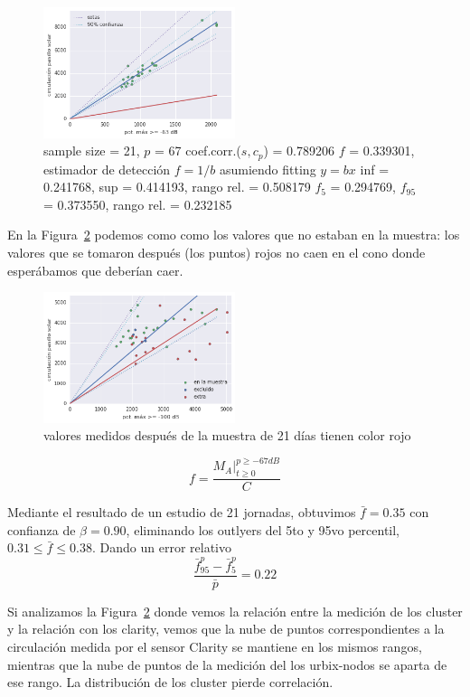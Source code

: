\begin{figure}[H] 
  \centering
  \includegraphics[width=0.5\textwidth]{Fig_fit_circulacion_por_jornada.png}
  \caption{
  sample size = 21, $p$ = 67
coef.corr.($s, c_p$) = 0.789206
$f$ = 0.339301, estimador de detección $f = 1/b$ asumiendo fitting $y = b x$
inf = 0.241768, sup = 0.414193, rango rel. = 0.508179
$f_5$ = 0.294769, $f_{95}$ = 0.373550, rango rel. = 0.232185
  }
  \label{fig:fitting_67}
\end{figure}

En la Figura~\ref{fig:prediction} podemos como como los valores que no estaban en la muestra: los valores que se tomaron después (los puntos) rojos no caen en el cono donde esperábamos que deberían caer.

\begin{figure}[H] 
  \centering
  \includegraphics[width=0.5\textwidth]{scatter-sample-n-next.png}
  \caption{valores medidos después de la muestra de 21 días tienen color rojo
  }
  \label{fig:prediction}
\end{figure}

\[
f = \frac{M_A \Big|_{t\ge 0}^{p \ge -67dB}}{C}
\]


Mediante el resultado de un estudio de 21 jornadas,
obtuvimos $\bar{f} = 0.35$ con confianza de $\beta = 0.90$,
eliminando los outlyers del 5to y 95vo percentil,
$0.31 \le \bar{f} \le 0.38$. Dando un error relativo 
\[
\frac{\bar{f}_{95}^p - \bar{f}_5^p}{\bar{p}} = 0.22
\]

Si analizamos la Figura~\ref{fig:prediction} donde vemos la relación entre la medición de los cluster y la relación con los clarity, vemos que la nube de puntos correspondientes a la circulación medida por el sensor Clarity se mantiene en los mismos rangos, mientras que la nube de puntos de la medición del los urbix-nodos se aparta de ese rango. La distribución de los cluster pierde correlación.

